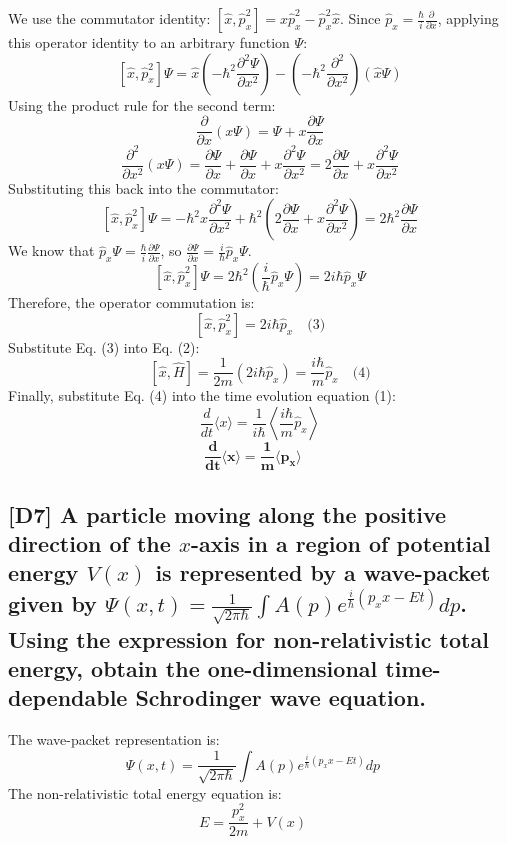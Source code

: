 \documentclass[12pt]{article}
\begin{document}
We use the commutator identity: $[\hat{x}, \hat{p}_x^2] = \hat{x}\hat{p}_x^2 - \hat{p}_x^2\hat{x}$.
Since $\hat{p}_x = \frac{\hbar}{i} \frac{\partial}{\partial x}$, applying this operator identity to an arbitrary function $\Psi$:
$$
[\hat{x}, \hat{p}_x^2] \Psi = \hat{x}\left(-\hbar^2 \frac{\partial^2\Psi}{\partial x^2}\right) - \left(-\hbar^2 \frac{\partial^2}{\partial x^2}\right) (\hat{x}\Psi)
$$
Using the product rule for the second term:
$$
\frac{\partial}{\partial x} (x\Psi) = \Psi + x\frac{\partial\Psi}{\partial x}
$$
$$
\frac{\partial^2}{\partial x^2} (x\Psi) = \frac{\partial\Psi}{\partial x} + \frac{\partial\Psi}{\partial x} + x\frac{\partial^2\Psi}{\partial x^2} = 2\frac{\partial\Psi}{\partial x} + x\frac{\partial^2\Psi}{\partial x^2}
$$
Substituting this back into the commutator:
$$
[\hat{x}, \hat{p}_x^2] \Psi = -\hbar^2 x \frac{\partial^2\Psi}{\partial x^2} + \hbar^2 \left( 2\frac{\partial\Psi}{\partial x} + x\frac{\partial^2\Psi}{\partial x^2} \right) = 2\hbar^2 \frac{\partial\Psi}{\partial x}
$$
We know that $\hat{p}_x \Psi = \frac{\hbar}{i} \frac{\partial\Psi}{\partial x}$, so $\frac{\partial\Psi}{\partial x} = \frac{i}{\hbar} \hat{p}_x \Psi$.
$$
[\hat{x}, \hat{p}_x^2] \Psi = 2\hbar^2 \left(\frac{i}{\hbar} \hat{p}_x \Psi\right) = 2i\hbar \hat{p}_x \Psi
$$
Therefore, the operator commutation is:
$$
[\hat{x}, \hat{p}_x^2] = 2i\hbar \hat{p}_x \quad \text{(3)}
$$
Substitute Eq. (3) into Eq. (2):
$$
[\hat{x}, \hat{H}] = \frac{1}{2m} (2i\hbar \hat{p}_x) = \frac{i\hbar}{m} \hat{p}_x \quad \text{(4)}
$$
Finally, substitute Eq. (4) into the time evolution equation (1):
$$
\frac{d}{dt} \langle x \rangle = \frac{1}{i\hbar} \left\langle \frac{i\hbar}{m} \hat{p}_x \right\rangle
$$
$$
\mathbf{\frac{d}{dt} \langle x \rangle = \frac{1}{m} \langle p_x \rangle} \quad
$$

\subsection{[D7] A particle moving along the positive direction of the $x$-axis in a region of potential energy $V(x)$ is represented by a wave-packet given by $\Psi(x, t) = \frac{1}{\sqrt{2\pi\hbar}} \int A(p) e^{\frac{i}{\hbar}(p_x x - E t)} dp$. Using the expression for non-relativistic total energy, obtain the one-dimensional time-dependable Schrodinger wave equation.}

The wave-packet representation is:
$$
\Psi(x, t) = \frac{1}{\sqrt{2\pi\hbar}} \int A(p) e^{\frac{i}{\hbar}(p_x x - E t)} dp \quad \text{}
$$
The non-relativistic total energy equation is:
$$
E = \frac{p_x^2}{2m} + V(x) \quad \text{}
$$
\end{document}
